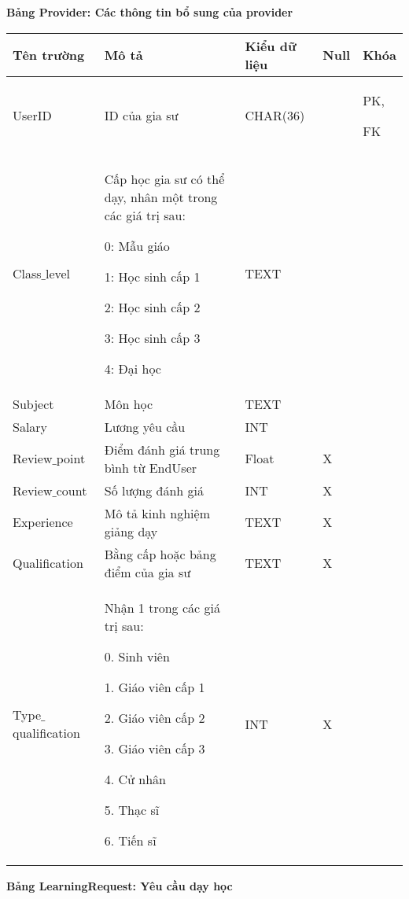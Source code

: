 \documentclass[12pt,a4paper]{report}
\begin{document}
\newpage
\textbf{Bảng Provider: Các thông tin bổ sung của provider}
\begin{center}
\begin{tabular}{|>{\raggedright\arraybackslash}m{3.5cm}|>{\raggedright\arraybackslash}m{5cm}|>{\raggedright\arraybackslash}m{3.6cm}| >{\centering\arraybackslash}m{1cm}| >{\centering\arraybackslash}m{1cm}|}
\hline 
\textbf{Tên trường} & \textbf{Mô tả} & \textbf{Kiểu dữ liệu} & \textbf{Null} & \textbf{Khóa} \\ 
\hline
UserID & ID của gia sư & CHAR(36) &  & PK,

FK \\ 
\hline 
Class$\_$level & Cấp học gia sư có thể dạy, nhân một trong các giá trị sau:

0: Mẫu giáo

1: Học sinh cấp 1

2: Học sinh cấp 2

3: Học sinh cấp 3

4: Đại học & TEXT &  &  \\ 
\hline 
Subject & Môn học & TEXT &  &  \\
\hline 
Salary & Lương yêu cầu & INT &  &  \\  
\hline 
Review$\_$point & Điểm đánh giá trung bình từ EndUser & Float & X &  \\ 
\hline 
Review$\_$count & Số lượng đánh giá & INT & X &  \\ 
\hline 
Experience & Mô tả kinh nghiệm giảng dạy & TEXT & X &  \\ 
\hline 
Qualification & Bằng cấp hoặc bảng điểm của gia sư & TEXT & X &  \\ 
\hline 
Type$\_$qualification & Nhận 1 trong các giá trị sau:

0. Sinh viên

1. Giáo viên cấp 1

2. Giáo viên cấp 2

3. Giáo viên cấp 3

4. Cử nhân

5. Thạc sĩ

6. Tiến sĩ & INT & X &  \\ 
\hline
\end{tabular} 
\end{center}

\textbf{Bảng LearningRequest: Yêu cầu dạy học}
\end{document}
